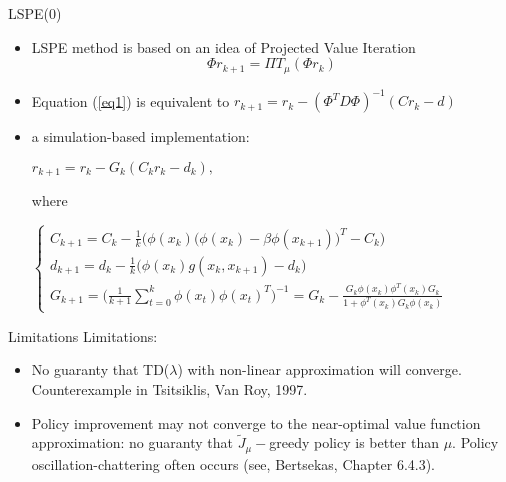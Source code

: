 \documentclass{beamer}
\begin{document}
\begin{frame}{LSPE(0)}



\begin{itemize}
\item LSPE method is based on an idea of Projected Value Iteration
\begin{equation}\label{eq1}
\Phi r_{k+1} = \Pi T_\mu(\Phi r_k)
\end{equation}

\item Equation (\ref{eq1}) is equivalent to 
$
r_{k+1} = r_k - (\Phi^T D \Phi)^{-1} (Cr_k - d)
$

\item a simulation-based implementation:
\begin{center}
$
r_{k+1} = r_k - G_k (C_kr_k - d_k)
,$
\end{center}
where


\begin{center}
$\begin{cases}
C_{k+1} = C_k - \frac{1}{k}\Big(\phi(x_k)\Big(\phi(x_k) - \beta \phi(x_{k+1}) \Big)^T -C_k\Big )\\
d_{k+1} = d_k - \frac{1}{k}\Big( \phi(x_k)g(x_k, x_{k+1}) -d_k\Big)\\
G_{k+1} = \Big(\frac{1}{k+1}\sum\limits_{t=0}^{k} \phi(x_t)\phi(x_t)^T\Big )^{-1} = G_k - \frac{G_k\phi(x_k) \phi^T(x_k)G_k}{1+\phi^T(x_k)G_k\phi(x_k)}
\end{cases}$
\end{center}



\end{itemize}
\end{frame}


\begin{frame}{Limitations}
Limitations:
\begin{itemize}
  \item No guaranty that TD($\lambda$) with non-linear approximation will converge. Counterexample in Tsitsiklis, Van Roy, 1997.  
  \item Policy improvement may not converge to the near-optimal value function approximation:
  no guaranty that $\tilde J_\mu-$greedy policy is better than $\mu$. Policy oscillation-chattering often occurs (see, Bertsekas, Chapter 6.4.3).  
  \end{itemize}


\end{frame}
\end{document}
